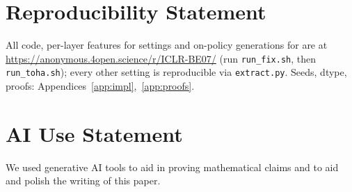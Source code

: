 \documentclass{article}
\theoremstyle{definition}
\begin{document}
\section*{Reproducibility Statement}
All code, per-layer features for \ReleaseLayerN{} settings and on-policy generations for \ReleaseGenList{} are at \url{https://anonymous.4open.science/r/ICLR-BE07/} (run \texttt{run\_fix.sh}, then \texttt{run\_toha.sh}); every other setting is reproducible via \texttt{extract.py}. Seeds, dtype, proofs: Appendices~\ref{app:impl},~\ref{app:proofs}.

\section*{AI Use Statement}
We used generative AI tools to aid in proving mathematical claims and to aid and polish the writing of this paper.




\newpage
\appendix

\end{document}
